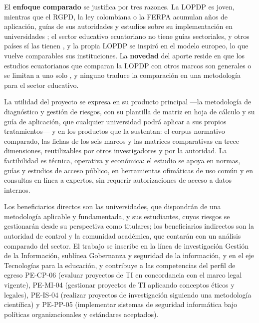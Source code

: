 El \textbf{enfoque comparado} se justifica por tres razones. La LOPDP es joven, mientras que el RGPD, la ley colombiana o la FERPA acumulan años de aplicación, guías de sus autoridades y estudios sobre su implementación en universidades \cite{fpf2020gdpr,almeida2024lgpd,correa2024rosario}; el sector educativo ecuatoriano no tiene guías sectoriales, y otros países sí las tienen \cite{anpd2023academicos,nces2004privacy}, y la propia LOPDP se inspiró en el modelo europeo, lo que vuelve comparables sus instituciones. La \textbf{novedad} del aporte reside en que los estudios ecuatorianos que comparan la LOPDP con otros marcos son generales o se limitan a uno solo \cite{perezvaca2021,garcia2024rgpd,iza2023lopdp,echeverria2026riesgos}, y ninguno traduce la comparación en una metodología para el sector educativo.

La utilidad del proyecto se expresa en su producto principal ---la metodología de diagnóstico y gestión de riesgos, con su plantilla de matriz en hoja de cálculo y su guía de aplicación, que cualquier universidad podrá aplicar a sus propios tratamientos--- y en los productos que la sustentan: el corpus normativo comparado, las fichas de los seis marcos y las matrices comparativas en trece dimensiones, reutilizables por otros investigadores y por la autoridad. La factibilidad es técnica, operativa y económica: el estudio se apoya en normas, guías y estudios de acceso público, en herramientas ofimáticas de uso común y en consultas en línea a expertos, sin requerir autorizaciones de acceso a datos internos.

Los beneficiarios directos son las universidades, que dispondrán de una metodología aplicable y fundamentada, y sus estudiantes, cuyos riesgos se gestionarán desde su perspectiva como titulares; los beneficiarios indirectos son la autoridad de control y la comunidad académica, que contarán con un análisis comparado del sector. El trabajo se inscribe en la línea de investigación Gestión de la Información, sublínea Gobernanza y seguridad de la información, y en el eje Tecnologías para la educación, y contribuye a las competencias del perfil de egreso PE-CP-06 (evaluar proyectos de TI en concordancia con el marco legal vigente), PE-MI-04 (gestionar proyectos de TI aplicando conceptos éticos y legales), PE-IS-04 (realizar proyectos de investigación siguiendo una metodología científica) y PE-PP-05 (implementar sistemas de seguridad informática bajo políticas organizacionales y estándares aceptados).

